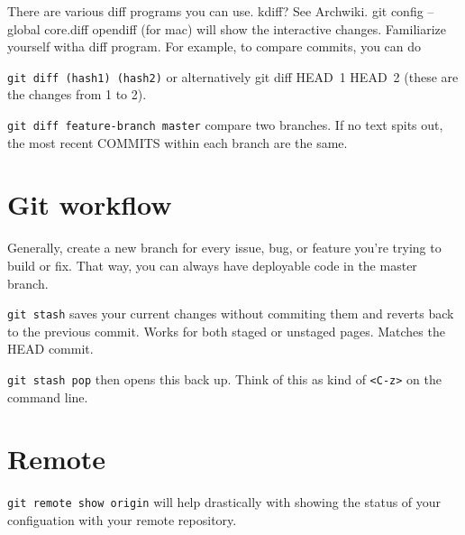 \documentclass[iop,floatfix]{emulateapj}
\begin{document}
There are various diff programs you can use. kdiff? See Archwiki.
git config --global core.diff opendiff (for mac) will show the interactive changes. Familiarize yourself witha diff program. For example, to compare commits, you can do 

\verb|git diff (hash1) (hash2)| or alternatively git diff HEAD~1 HEAD~2 (these are the changes from 1 to 2).

\verb|git diff feature-branch master| compare two branches. If no text spits out, the most recent COMMITS within each branch are the same.



\section{Git workflow}
Generally, create a new branch for every issue, bug, or feature you're trying
to build or fix. That way, you can always have deployable code in the master
branch. 

\verb|git stash| saves your current changes without commiting them and reverts back to the previous commit. Works for both staged or unstaged pages. Matches the HEAD commit.

\verb|git stash pop| then opens this back up. Think of this as kind of \verb|<C-z>| on the command line.


\section{Remote}
\verb|git remote show origin| will help drastically with showing the status of your configuation with your remote repository.
\end{document}
